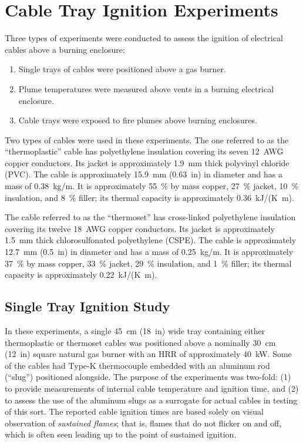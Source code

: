 \clearpage

\section{Cable Tray Ignition Experiments}
\label{Sec:Cables}

Three types of experiments were conducted to assess the ignition of electrical cables above a burning enclosure:
\begin{enumerate}
\item Single trays of cables were positioned above a gas burner.
\item Plume temperatures were measured above vents in a burning electrical enclosure.
\item Cable trays were exposed to fire plumes above burning enclosures.
\end{enumerate}
Two types of cables were used in these experiments. The one referred to as the ``thermoplastic'' cable has polyethylene insulation covering its seven 12~AWG copper conductors. Its jacket is approximately 1.9~mm thick polyvinyl chloride (PVC). The cable is approximately 15.9~mm (0.63~in) in diameter and has a mass of 0.38~kg/m. It is approximately 55~\% by mass copper, 27~\% jacket, 10~\% insulation, and 8~\% filler; its thermal capacity is approximately 0.36~kJ/(K~m).

The cable referred to as the ``thermoset'' has cross-linked polyethylene insulation covering its twelve 18~AWG copper conductors. Its jacket is approximately 1.5~mm thick chlorosulfonated polyethylene (CSPE). The cable is approximately 12.7~mm (0.5~in) in diameter and has a mass of 0.25~kg/m. It is approximately 37~\% by mass copper, 33~\% jacket, 29~\% insulation, and 1~\% filler; its thermal capacity is approximately 0.22~kJ/(K~m).

\subsection{Single Tray Ignition Study}

In these experiments, a single 45~cm (18~in) wide tray containing either thermoplastic or thermoset cables was positioned above a nominally 30~cm (12~in) square natural gas burner with an HRR of approximately 40~kW. Some of the cables had Type-K thermocouple embedded with an aluminum rod (``slug'') positioned alongside. The purpose of the experiments was two-fold: (1) to provide measurements of internal cable temperature and ignition time, and (2) to assess the use of the aluminum slugs as a surrogate for actual cables in testing of this sort. The reported cable ignition times are based solely on visual observation of {\em sustained flames}; that is, flames that do not flicker on and off, which is often seen leading up to the point of sustained ignition.



